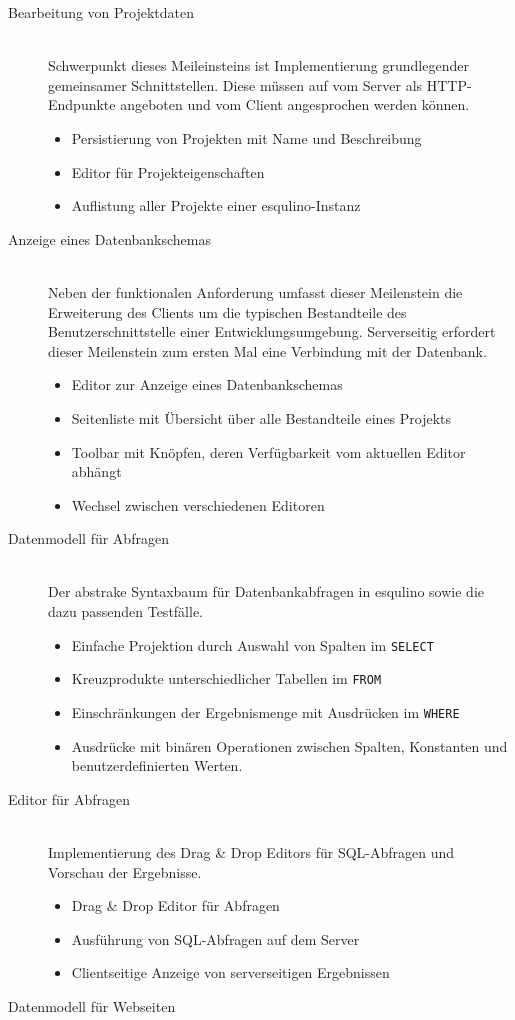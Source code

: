 \begin{description}
\item[Bearbeitung von Projektdaten] \hfill \\
  Schwerpunkt dieses Meileinsteins ist Implementierung grundlegender gemeinsamer Schnittstellen. Diese müssen auf vom Server als HTTP-Endpunkte angeboten und vom Client angesprochen werden können.
  \begin{itemize}
  \item Persistierung von Projekten mit Name und Beschreibung
  \item Editor für Projekteigenschaften
  \item Auflistung aller Projekte einer esqulino-Instanz
  \end{itemize}
\item [Anzeige eines Datenbankschemas] \hfill \\
  Neben der funktionalen Anforderung umfasst dieser Meilenstein die Erweiterung des Clients um die typischen Bestandteile des Benutzerschnittstelle einer Entwicklungsumgebung. Serverseitig erfordert dieser Meilenstein zum ersten Mal eine Verbindung mit der Datenbank.
  \begin{itemize}
  \item Editor zur Anzeige eines Datenbankschemas
  \item Seitenliste mit Übersicht über alle Bestandteile eines Projekts
  \item Toolbar mit Knöpfen, deren Verfügbarkeit vom aktuellen Editor abhängt
  \item Wechsel zwischen verschiedenen Editoren
  \end{itemize}
\item [Datenmodell für Abfragen] \hfill \\
  Der abstrake Syntaxbaum für Datenbankabfragen in esqulino sowie die dazu passenden Testfälle.
  \begin{itemize}
  \item Einfache Projektion durch Auswahl von Spalten im \texttt{SELECT}
  \item Kreuzprodukte unterschiedlicher Tabellen im \texttt{FROM}
  \item Einschränkungen der Ergebnismenge mit Ausdrücken im \texttt{WHERE}
  \item Ausdrücke mit binären Operationen zwischen Spalten, Konstanten und benutzerdefinierten Werten.
  \end{itemize}
\item [Editor für Abfragen] \hfill \\
  Implementierung des Drag \& Drop Editors für SQL-Abfragen und Vorschau der Ergebnisse.
  \begin{itemize}
  \item Drag \& Drop Editor für Abfragen
  \item Ausführung von SQL-Abfragen auf dem Server
  \item Clientseitige Anzeige von serverseitigen Ergebnissen
  \end{itemize}
\item [Datenmodell für Webseiten] \hfill \\


\end{description}
